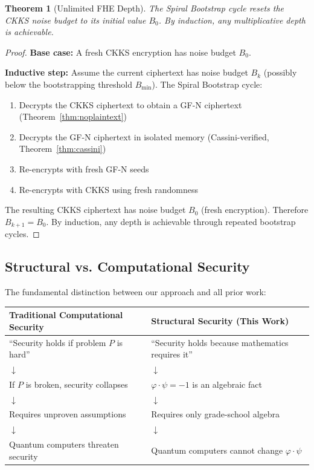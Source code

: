 \documentclass[11pt,a4paper]{article}
\newtheorem{theorem}{Theorem}[section]
\begin{document}
\begin{theorem}[Unlimited FHE Depth]\label{thm:depth}
The Spiral Bootstrap cycle resets the CKKS noise budget to its initial value $B_0$. By induction, any multiplicative depth is achievable.
\end{theorem}
\begin{proof}
\textbf{Base case:} A fresh CKKS encryption has noise budget $B_0$.

\textbf{Inductive step:} Assume the current ciphertext has noise budget $B_k$ (possibly below the bootstrapping threshold $B_{\min}$). The Spiral Bootstrap cycle:
\begin{enumerate}[nosep]
    \item Decrypts the CKKS ciphertext to obtain a GF-N ciphertext (Theorem~\ref{thm:noplaintext})
    \item Decrypts the GF-N ciphertext in isolated memory (Cassini-verified, Theorem~\ref{thm:cassini})
    \item Re-encrypts with fresh GF-N seeds
    \item Re-encrypts with CKKS using fresh randomness
\end{enumerate}
The resulting CKKS ciphertext has noise budget $B_0$ (fresh encryption). Therefore $B_{k+1} = B_0$. By induction, any depth is achievable through repeated bootstrap cycles.
\end{proof}

\subsection{Structural vs. Computational Security}

The fundamental distinction between our approach and all prior work:

\begin{center}
\begin{tabular}{p{}|p{}}
\textbf{Traditional Computational Security} & \textbf{Structural Security (This Work)} \\
\hline
``Security holds if problem $P$ is hard'' & ``Security holds because mathematics requires it'' \\
$\downarrow$ & $\downarrow$ \\
If $P$ is broken, security collapses & $\varphi \cdot \psi = -1$ is an algebraic fact \\
$\downarrow$ & $\downarrow$ \\
Requires unproven assumptions & Requires only grade-school algebra \\
$\downarrow$ & $\downarrow$ \\
Quantum computers threaten security & Quantum computers cannot change $\varphi \cdot \psi$ \\
\end{tabular}
\end{center}
\end{document}
